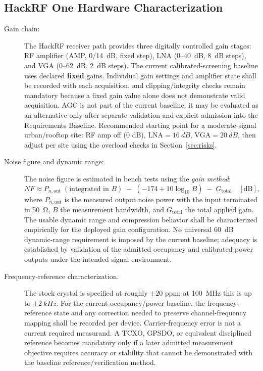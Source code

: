 \documentclass[12pt,a4paper]{report}
\newcommand{\dB}{\ensuremath{\mathrm{dB}}}
\newcommand{\MHz}{\ensuremath{\mathrm{MHz}}}
\begin{document}
 \subsection*{HackRF One Hardware Characterization} 	\label{sec:cal}
 \begin{description}
 	\item[Gain chain:] The HackRF receiver path provides three digitally controlled gain stages:
 	RF amplifier (AMP, 0/\SI{14}{dB}, fixed step), LNA (0--\SI{40}{dB}, \SI{8}{dB}
 	steps), and VGA (0--\SI{62}{dB}, \SI{2}{dB} steps). The current calibrated-screening baseline uses declared \textbf{fixed} gains. Individual gain settings and amplifier state shall be recorded with each acquisition, and clipping/integrity checks remain mandatory because a fixed gain value alone does not demonstrate valid acquisition. AGC is not part of the current baseline; it may be evaluated as an alternative only after separate validation and explicit admission into the Requirements Baseline.
 	Recommended starting point for a moderate-signal urban/rooftop site:
 	RF amp off (0 dB), $\text{LNA}=\SI{16}{dB}$, $\text{VGA}=\SI{20}{dB}$,
 	then adjust per site using the overload checks in Section~\ref{sec:risks}.
 	\item[Noise figure and dynamic range:] The noise figure is estimated in bench tests using the \emph{gain method}:
 	\begin{equation}
 		NF \approx P_{n,\text{out}} \;(\text{integrated in } B) \;-\; (-174 +
 		10\log_{10} B) \;-\; G_{\text{total}}
 		\quad [\dB],
 	\end{equation}
 	where $P_{n,\text{out}}$ is the measured output noise power with the input
 	terminated in \SI{50}{\ohm}, $B$ the measurement bandwidth, and $G_{\text{total}}$
 	the total applied gain. The usable dynamic range and compression behavior shall be characterized empirically for the deployed gain configuration. No universal 60~dB dynamic-range requirement is imposed by the current baseline; adequacy is established by validation of the admitted occupancy and calibrated-power outputs under the intended signal environment.
 	\item[Frequency-reference characterization.] The stock crystal is specified at roughly $\pm 20$ ppm; at \SI{100}{\MHz} this is up to $\pm \SI{2}{kHz}$. For the current occupancy/power baseline, the frequency-reference state and any correction needed to preserve channel-frequency mapping shall be recorded per device. Carrier-frequency error is not a current required measurand. A TCXO, GPSDO, or equivalent disciplined reference becomes mandatory only if a later admitted measurement objective requires accuracy or stability that cannot be demonstrated with the baseline reference/verification method.

\end{description}
\end{document}
